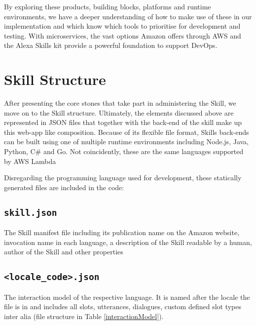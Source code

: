 By exploring these products, building blocks, platforms and runtime environments, we have a deeper understanding of how to make use of these in our implementation and which know which tools to prioritise for development and testing. With microservices, the vast options Amazon offers through AWS and the Alexa Skills kit provide a powerful foundation to support DevOps.
	


\section{Skill Structure}


After presenting the core stones that take part in administering the Skill, we move on to the Skill structure. Ultimately, the elements discussed above are represented in JSON files that together with the back-end of the skill make up this web-app like composition. Because of its flexible file format, Skills back-ends can be built using one of multiple runtime environments including Node.js, Java, Python, C\# and Go. 
Not coincidently, these are the same languages supported by AWS Lambda %

Disregarding the programming language used for development, these statically generated files are included in the code:


\subsection*{\texttt{skill.json}}
The Skill manifest file including its publication name on the Amazon website, invocation name in each language, a description of the Skill readable by a human, author of the Skill and other properties

\subsection*{\texttt{<locale_code>.json}}
The interaction model of the respective language. It is named after the locale the file is in and includes all slots, utterances, dialogues, custom defined slot types inter alia (file structure in Table \ref{interactionModel}).

